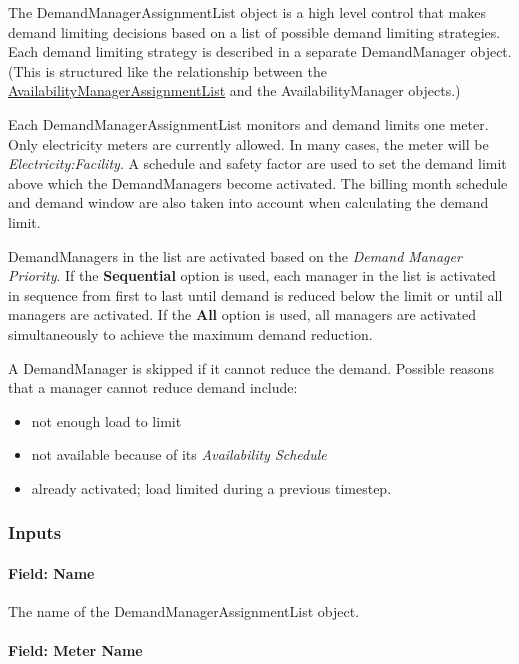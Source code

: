 The DemandManagerAssignmentList object is a high level control that makes demand limiting decisions based on a list of possible demand limiting strategies. Each demand limiting strategy is described in a separate DemandManager object. (This is structured like the relationship between the \hyperref[availabilitymanagerassignmentlist]{AvailabilityManagerAssignmentList} and the AvailabilityManager objects.)

Each DemandManagerAssignmentList monitors and demand limits one meter. Only electricity meters are currently allowed. In many cases, the meter will be \emph{Electricity:Facility}. A schedule and safety factor are used to set the demand limit above which the DemandManagers become activated. The billing month schedule and demand window are also taken into account when calculating the demand limit.

DemandManagers in the list are activated based on the \emph{Demand Manager Priority}. If the \textbf{Sequential} option is used, each manager in the list is activated in sequence from first to last until demand is reduced below the limit or until all managers are activated. If the \textbf{All} option is used, all managers are activated simultaneously to achieve the maximum demand reduction.

A DemandManager is skipped if it cannot reduce the demand. Possible reasons that a manager cannot reduce demand include:

\begin{itemize}
\item
  not enough load to limit
\item
  not available because of its \emph{Availability Schedule}
\item
  already activated; load limited during a previous timestep.
\end{itemize}

\subsubsection{Inputs}

\paragraph{Field: Name}\label{field-name-009}

The name of the DemandManagerAssignmentList object.

\paragraph{Field: Meter Name}\label{field-meter-name}

